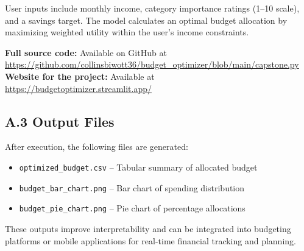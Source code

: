 \documentclass{article}
\begin{document}
User inputs include monthly income, category importance ratings (1–10 scale), and a savings target. The model calculates an optimal budget allocation by maximizing weighted utility within the user’s income constraints.

\textbf{Full source code:} Available on GitHub at\\
\url{https://github.com/collinsbiwott36/budget_optimizer/blob/main/capstone.py}
\textbf{Website for the project:} Available at\\
\url{https://budgetoptimizer.streamlit.app/}

\subsection*{A.3 Output Files}

After execution, the following files are generated:
\begin{itemize}
    \item \texttt{optimized\_budget.csv} – Tabular summary of allocated budget
    \item \texttt{budget\_bar\_chart.png} – Bar chart of spending distribution
    \item \texttt{budget\_pie\_chart.png} – Pie chart of percentage allocations
\end{itemize}

These outputs improve interpretability and can be integrated into budgeting platforms or mobile applications for real-time financial tracking and planning.
\end{document}
